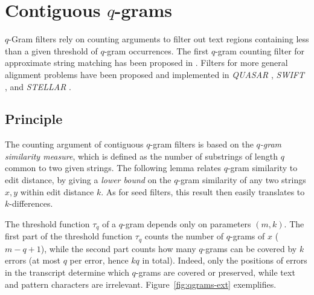 




\section{Contiguous $q$-grams}
\label{sec:filtering:qgrams-ext}

$q$-Gram filters rely on counting arguments to filter out text regions containing less than a given threshold of $q$-gram occurrences.
The first $q$-gram counting filter for approximate string matching has been proposed in \citep{Jokinen1991}.
Filters for more general alignment problems have been proposed and implemented in \emph{QUASAR} \citep{Burkhardt1999}, \emph{SWIFT} \citep{Rasmussen2006}, and \emph{STELLAR} \citep{Kehr2011}.

\subsection{Principle}

The counting argument of contiguous $q$-gram filters is based on the \emph{$q$-gram similarity measure}, which is defined as the number of substrings of length $q$ common to two given strings.
The following lemma relates $q$-gram similarity to edit distance, by giving a \emph{lower bound} on the $q$-gram similarity of any two strings $x,y$ within edit distance $k$.
As for seed filters, this result then easily translates to $k$-differences.

The threshold function $\tau_q$ of a $q$-gram depends only on parameters $(m,k)$.
The first part of the threshold function $\tau_q$ counts the number of $q$-grams of $x$ (\ie $m - q + 1$), while the second part counts how many $q$-grams can be covered by $k$ errors (\ie at most $q$ per error, hence $kq$ in total).
Indeed, only the positions of errors in the transcript determine which $q$-grams are covered or preserved, while text and pattern characters are irrelevant.
Figure~\ref{fig:qgrams-ext} exemplifies.

